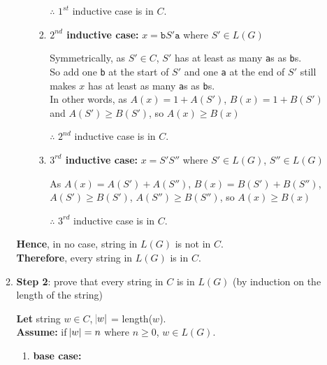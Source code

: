 \documentclass[11pt]{article}
\begin{document}
\begin{enumerate}
\begin{enumerate}
\begin{enumerate}
\begin{enumerate}
            $\therefore$ $1^{st}$ inductive case is in $C$.
            
            \item \textbf{$2^{nd}$ inductive case:} $x = \texttt{b} S' \texttt{a}$ where $S' \in L(G)$
            
            Symmetrically, as $S' \in C$, $S'$ has at least as many \texttt{a}s as \texttt{b}s. \\
            So add one \texttt{b} at the start of $S'$ and one \texttt{a} at the end of $S'$ still makes $x$ has at least as many \texttt{a}s as \texttt{b}s. \\
            In other words, as $A(x) = 1 + A(S')$, $B(x) = 1 + B(S')$ and $A(S') \geq B(S')$, so $A(x) \geq B(x)$
            
            $\therefore$ $2^{nd}$ inductive case is in $C$.
            
            \item \textbf{$3^{rd}$ inductive case:} $x = S' S''$ where $S' \in L(G)$, $S'' \in L(G)$
            
            As $A(x) = A(S') + A(S'')$, $B(x) = B(S') + B(S'')$, $A(S') \geq B(S')$, $A(S'') \geq B(S'')$, so $A(x) \geq B(x)$
            
            $\therefore$ $3^{rd}$ inductive case is in $C$.
        
        \end{enumerate}
    \end{enumerate}
    
    \textbf{Hence}, in no case, string in $L(G)$ is not in $C$. \\
    \textbf{Therefore}, every string in $L(G)$ is in $C$. \\
    
    \item \textbf{Step 2}: prove that every string in $C$ is in $L(G)$ (by induction on the length of the string)
    
    \textbf{Let} string $w \in C$, $\abs{w}$ = length($w$). \\
    \textbf{Assume:} if $\abs{w} = n$ where $n \geq 0$, $w \in L(G)$. 
    
    \begin{enumerate}
        \item \textbf{base case:}
    
        \begin{enumerate}
    

\end{enumerate}
\end{enumerate}
\end{enumerate}
\end{enumerate}
\end{document}
